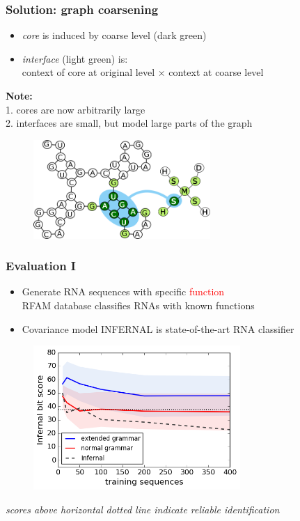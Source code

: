 \documentclass{beamer}
\newcommand{\red}[1]{\textcolor{red}{#1}}
\begin{document}
\begin{frame}
    \frametitle{Solution: graph coarsening}
    \begin{itemize}
        \item {\em core} is induced by coarse level (dark green)
        \item {\em interface} (light green) is: \\context of core at original level $\times$ context at coarse level
   \end{itemize}
    {\bf Note:} \\
    1. cores are now arbitrarily large\\
    2. interfaces are small, but model large parts of the graph
   \begin{figure}[ht]
        \centering
        \includegraphics[width=0.60\textwidth]{images/nucip.png}
    \end{figure}
\end{frame}





\begin{frame}
    \frametitle{Evaluation I}
    \begin{itemize}
        \item Generate RNA sequences with specific \red{function} \\
        RFAM database classifies RNAs with known functions
        \item Covariance model INFERNAL is state-of-the-art RNA classifier 
    \end{itemize}

   \begin{figure}[ht]
        \centering
        \includegraphics[width=0.70\textwidth]{images/infernal_abstr.png}
    \end{figure}
   \small{\em scores above horizontal dotted line indicate reliable identification}
\end{frame}
\end{document}

